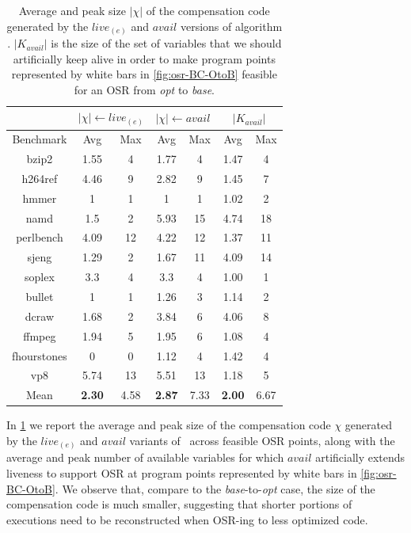 \begin{table}[!ht]
\begin{center}
\begin{small}
\begin{tabular}{ |c|c|c|c|c|c|c| }
\cline{2-7}
\multicolumn{1}{l|}{} & \multicolumn{2}{c|}{$|\chi|\leftarrow live_{(e)}$} & \multicolumn{2}{c|}{$|\chi|\leftarrow avail$} & \multicolumn{2}{c|}{$|K_{avail}|$} \\
\hline
Benchmark & Avg & Max & Avg & Max & Avg & Max \\
\hline
\hline
bzip2 & 1.55 & 4 & 1.77 & 4 & 1.47 & 4 \\
\hline
h264ref & 4.46 & 9 & 2.82 & 9 & 1.45 & 7 \\
\hline
hmmer & 1 & 1 & 1 & 1 & 1.02 & 2 \\
\hline
namd & 1.5 & 2 & 5.93 & 15 & 4.74 & 18\\
\hline
perlbench & 4.09 & 12 & 4.22 & 12 & 1.37 & 11 \\
\hline
sjeng & 1.29 & 2 & 1.67 & 11 & 4.09 & 14 \\
\hline
soplex & 3.3 & 4 & 3.3 & 4 & 1.00 & 1 \\
\hline
bullet & 1 & 1 & 1.26 & 3 & 1.14 & 2 \\
\hline
dcraw & 1.68 & 2 & 3.84 & 6 & 4.06 & 8 \\
\hline
ffmpeg & 1.94 & 5 & 1.95 & 6 & 1.08 & 4 \\
\hline
fhourstones & 0 & 0 & 1.12 & 4 & 1.42 & 4 \\
\hline
vp8 & 5.74 & 13 & 5.51 & 13 & 1.18 & 5 \\
\hline
\hline
Mean & {\bf 2.30} & 4.58 & {\bf 2.87} & 7.33 & {\bf 2.00} & 6.67 \\
\hline
\end{tabular}
\end{small}
\end{center}
\caption{\label{tab:OSR-alC-prologue-OtoB} Average and peak size $|\chi|$ of the compensation code generated by the $live_{(e)}$ and $avail$ versions of algorithm \reconstruct. $|K_{avail}|$ is the size of the set of variables that we should artificially keep alive in order to make program points represented by white bars in \myfigure\ref{fig:osr-BC-OtoB} feasible for an OSR from {\em opt} to {\em base}.}
\end{table}

\noindent In \mytable\ref{tab:OSR-alC-prologue-OtoB} we report the average and peak size of the compensation code $\chi$ generated by the $live_{(e)}$ and $avail$ variants of \reconstruct\ across feasible OSR points, along with the average and peak number of available variables for which $avail$ artificially extends liveness to support OSR at program points represented by white bars in \myfigure\ref{fig:osr-BC-OtoB}. We observe that, compare to the {\em base}-to-{\em opt} case, the size of the compensation code is much smaller, suggesting that shorter portions of executions need to be reconstructed when OSR-ing to less optimized code.

